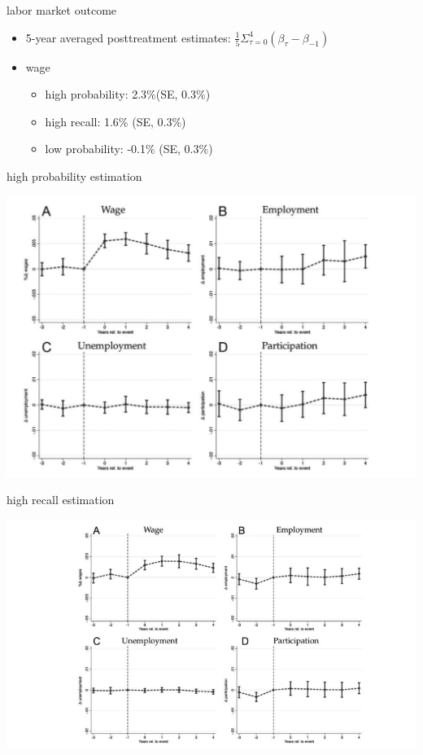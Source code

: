\documentclass[
  ignorenonframetext,
]{beamer}
\begin{document}
\begin{frame}{labor market outcome}
  \begin{itemize}
    \item 5-year averaged posttreatment estimates: $\frac{1}{5} \Sigma_{\tau=0}^4(\beta_{\tau} - \beta_{-1})$
    \item wage
    \begin{itemize}
      \item high probability: 2.3\%(SE, 0.3\%)
      \item high recall: 1.6\% (SE, 0.3\%)
      \item low probability: -0.1\% (SE, 0.3\%)
    \end{itemize}
  \end{itemize}
\end{frame}

\begin{frame}{high probability estimation}
  \begin{center}
    \includegraphics{figure/pdf/high_proba_res.png}
  \end{center}
\end{frame}

\begin{frame}{high recall estimation}
  \begin{center}
    \includegraphics{figure/pdf/high_recall_res.png}
  \end{center}
\end{frame}
\end{document}
